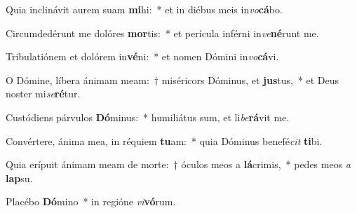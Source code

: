 \item Quia inclinávit aurem suam \textbf{mi}hi:~* et in diébus meis in\textit{vo}\textbf{cá}bo.
\item Circumdedérunt me dolóres \textbf{mor}tis:~* et perícula inférni in\textit{ve}\textbf{né}runt me.
\item Tribulatiónem et dolórem in\textbf{vé}ni:~* et nomen Dómini in\textit{vo}\textbf{cá}vi.
\item O Dómine, líbera ánimam meam:~† miséricors Dóminus, et \textbf{jus}tus,~* et Deus noster mi\textit{se}\textbf{ré}tur.
\item Custódiens párvulos \textbf{Dó}minus:~* humiliátus sum, et li\textit{be}\textbf{rá}vit me.
\item Convértere, ánima mea, in réquiem \textbf{tu}am:~* quia Dóminus benefé\textit{cit} \textbf{ti}bi.
\item Quia erípuit ánimam meam de morte:~† óculos meos a \textbf{lá}crimis,~* pedes meos \textit{a} \textbf{lap}su.
\item Placébo \textbf{Dó}mino~* in regióne \textit{vi}\textbf{vó}rum.

